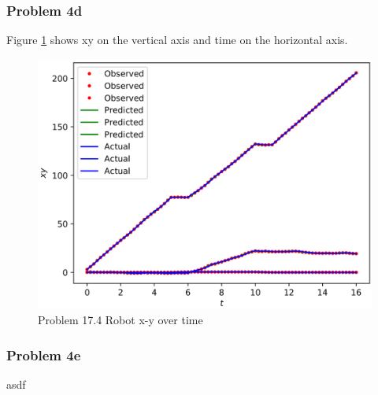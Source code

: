 \documentclass{article}
\begin{document}
\subsubsection{Problem 4d}
Figure \ref{fig:p17_4a_xyt} shows xy on the vertical axis and time on the 
horizontal axis.

\begin{figure}[h]
    \centering
    \includegraphics[scale=0.75]{problem17_4a_xy_t}
    \caption{Problem 17.4 Robot x-y over time}
    \label{fig:p17_4a_xyt}
\end{figure}

\subsubsection{Problem 4e}
asdf






\end{document}
